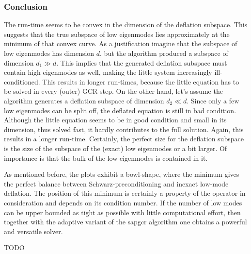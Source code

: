 \documentclass{article}
\theoremstyle{plain} %
\theoremstyle{convention} %
\theoremstyle{remark} %
\numberwithin{equation}{section}
\begin{document}
\subsubsection{Conclusion}

The run-time seems to be convex in the dimension of the deflation subspace. This suggests that the true subspace of low eigenmodes lies approximately at the minimum of that convex curve. As a justification imagine that the subspace of low eigenmodes has dimension $d$, but the algorithm produced a subspace of dimension $d_1 \gg d$. This implies that the generated deflation subspace must contain high eigenmodes as well, making the little system increasingly ill-conditioned. This results in longer run-times, because the little equation has to be solved in every (outer) GCR-step. On the other hand, let's assume the algorithm generates a deflation subspace of dimension $d_2 \ll d$. Since only a few low eigenmodes can be split off, the deflated equation is still in bad condition. Although the little equation seems to be in good condition and small in its dimension, thus solved fast, it hardly contributes to the full solution. Again, this results in a longer run-time. Certainly, the perfect size for the deflation subspace is the size of the subspace of the (exact) low eigenmodes or a bit larger. Of importance is that the bulk of the low eigenmodes is contained in it.

As mentioned before, the plots exhibit a bowl-shape, where the minimum gives the perfect balance between Schwarz-preconditioning and inexact low-mode deflation. The position of this minimum is certainly a property of the operator in consideration and depends on its condition number. If the number of low modes can be upper bounded as tight as possible with little computational effort, then together with the adaptive variant of the \acrshort*{sapgcr} algorithm one obtains a powerful and versatile solver.

TODO

\end{document}
